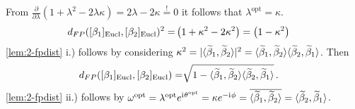 From $\frac{\partial}{\partial\lambda}\left( 1 + \lambda^2 - 2\lambda\kappa \right) = 2\lambda - 2\kappa \overset{!}{=} 0$ it follows that $\lambda^\mathrm{opt} = \kappa$.
\begin{align*}
  d_{FP}([\beta_1]_{\mathrm{Eucl}},[\beta_2]_{\mathrm{Eucl}})^2 
   = &  \left( 1 + \kappa^2  - 2 \kappa^2 \right) =  \left( 1 - \kappa^2 \right)
\end{align*}
\cref{lem:2-fpdist} i.) follows by considering $\kappa^2 = \lvert\langle \widetilde \beta_1, \widetilde \beta_2 \rangle\rvert^2 = \langle \widetilde \beta_1, \widetilde \beta_2 \rangle \langle \widetilde \beta_2, \widetilde \beta_1 \rangle$.
Then
\begin{align*}
  d_{FP}([\beta_1]_{\mathrm{Eucl}},[\beta_2]_{\mathrm{Eucl}})
   = &  \sqrt{ 1 - \langle \widetilde \beta_1, \widetilde \beta_2 \rangle \langle \widetilde \beta_2, \widetilde \beta_1 \rangle }\,.
\end{align*}
\cref{lem:2-fpdist} ii.) follows by $\omega^\mathrm{opt} = \lambda^\mathrm{opt} e^{\mathrm{i}\mkern1mu \theta^\mathrm{opt}} = \kappa e^{-\mathrm{i}\mkern1mu\phi} = \overline{\langle \widetilde \beta_1, \widetilde \beta_2 \rangle} = \langle \widetilde \beta_2, \widetilde \beta_1 \rangle$.



